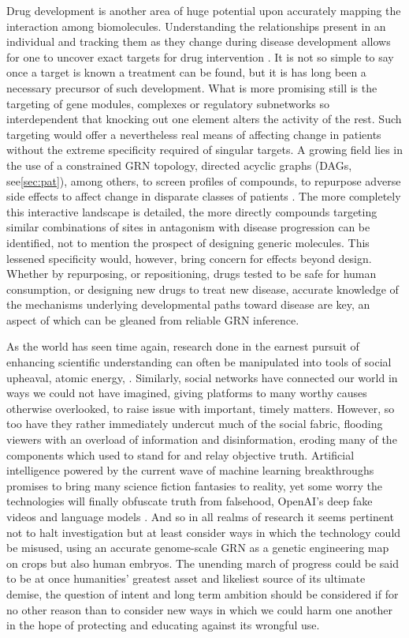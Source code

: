 Drug development is another area of huge potential upon accurately mapping the interaction among biomolecules. Understanding the relationships present in an individual and tracking them as they change during disease development allows for one to uncover exact targets for drug intervention \citep{schreiber2000target}. It is not so simple to say once a target is known a treatment can be found, but it is has long been a necessary precursor of such development. What is more promising still is the targeting of gene modules, complexes or regulatory subnetworks so interdependent that knocking out one element alters the activity of the rest. Such targeting would offer a nevertheless real means of affecting change in patients without the extreme specificity required of singular targets. A growing field lies in the use of a constrained GRN topology, directed acyclic graphs (DAGs, see\cref{sec:pat}), among others, to screen profiles of compounds, to repurpose adverse side effects to affect change in disparate classes of patients \citep{alaimo2016recommendation}. The more completely this interactive landscape is detailed, the more directly compounds targeting similar combinations of sites in antagonism with disease progression can be identified, not to mention the prospect of designing generic molecules. This lessened specificity would, however, bring concern for effects beyond design. Whether by repurposing, or repositioning, drugs tested to be safe for human consumption, or designing new drugs to treat new disease, accurate knowledge of the mechanisms underlying developmental paths toward disease are key, an aspect of which can be gleaned from reliable GRN inference.

As the world has seen time again, research done in the earnest pursuit of enhancing scientific understanding can often be manipulated into tools of social upheaval, \eg atomic energy, \etc. Similarly, social networks have connected our world in ways we could not have imagined, giving platforms to many worthy causes otherwise overlooked, to raise issue with important, timely matters. However, so too have they rather immediately undercut much of the social fabric, flooding viewers with an overload of information and disinformation, eroding many of the components which used to stand for and relay objective truth. Artificial intelligence powered by the current wave of machine learning breakthroughs promises to bring many science fiction fantasies to reality, yet some worry the technologies will finally obfuscate truth from falsehood, \ie OpenAI's deep fake videos and language models \citep{liu2019recurrent}. And so in all realms of research it seems pertinent not to halt investigation but at least consider ways in which the technology could be misused, \eg using an accurate genome-scale GRN as a genetic engineering map on crops but also human embryos. The unending march of progress could be said to be at once humanities' greatest asset and likeliest source of its ultimate demise, the question of intent and long term ambition should be considered if for no other reason than to consider new ways in which we could harm one another in the hope of protecting and educating against its wrongful use.